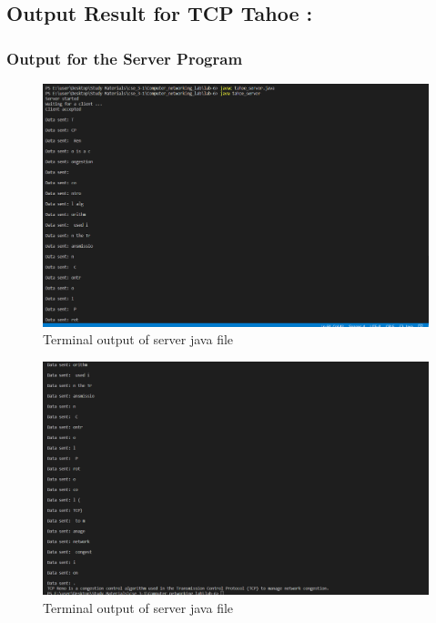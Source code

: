 \documentclass[11pt]{article}
\begin{document}
\subsection{Output Result for TCP Tahoe :}

\subsubsection{Output for the Server Program}

 \begin{figure}[!h]
\centering
\includegraphics[width=\textwidth]{t_server1.png}
\caption{Terminal output of server java file }
\end{figure}
\FloatBarrier

 \begin{figure}[!h]
\centering
\includegraphics[width=\textwidth]{t_server2.png}
\caption{Terminal output of server java file }
\end{figure}
\FloatBarrier
\end{document}
